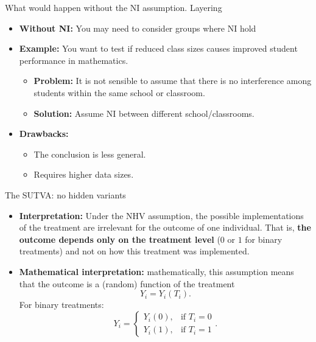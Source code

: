 \documentclass[aspectratio=169]{beamer}
\begin{document}
\begin{frame}{What would happen without the NI assumption. Layering }

    \begin{itemize}
        \item \textbf{Without NI:} You may need to consider groups where NI hold
        \item \textbf{Example:} You want to test if reduced class sizes causes improved student performance in mathematics. 
        \begin{itemize}
            \item[$\bullet$] \textbf{Problem:} It is not sensible to assume that there is no interference among students within the same school or classroom.
            \item[$\bullet$] \textbf{Solution:} Assume NI between different school/classrooms. 
        \end{itemize}
        
        \item \textbf{Drawbacks:} 
        \begin{itemize}
            \item[$\bullet$] The conclusion is less general.
            \item[$\bullet$] Requires higher data sizes.
        \end{itemize}
    \end{itemize}
      
\end{frame}

\begin{frame}{The SUTVA: no hidden variants}

\begin{itemize}
    \item \textbf{Interpretation:} Under the NHV assumption, the possible implementations of the treatment are irrelevant for the outcome of one individual. That is, \textbf{the outcome depends only on the treatment level} ($0$ or $1$ for binary treatments) and not on how this treatment was implemented. 
    \item \textbf{Mathematical interpretation:} mathematically, this assumption means that the outcome is a (random) function of the treatment
    $$
    Y_i = Y_i(T_i).
    $$
    For binary treatments: 
    $$
    Y_i =
    \begin{cases}
        Y_i(0), & \text{if } T_i = 0 \\
        Y_i(1), & \text{if } T_i = 1
    \end{cases}.
    $$
\end{itemize}

\end{frame}
    
\end{document}
